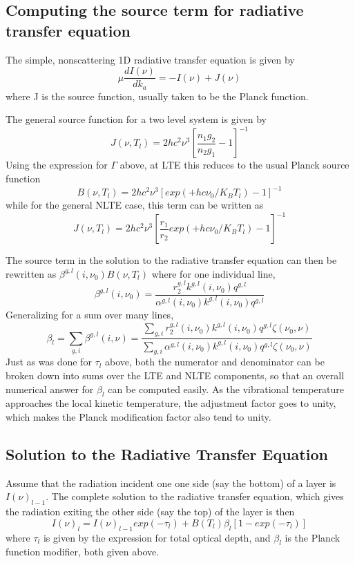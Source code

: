 \documentclass[11pt]{article}
\begin{document}
\subsection{Computing the source term for radiative transfer equation}

The simple, nonscattering 1D radiative transfer equation is given by
\[
\mu \frac{dI(\nu)}{dk_{a}} = -I(\nu) + J(\nu)
\]
where J is the source function, usually taken to be the Planck function.

The general source function for a two level system is given by 
\cite{edw:93,edw:98,lop:01}
\[
J(\nu,T_{l}) = 2 h c^{2} \nu^{3} [\frac{n_{1}g_{2}}{n_{2}g_{1}} - 1]^{-1}
\]
Using the expression for $\Gamma$ above, at LTE this reduces to the 
usual Planck source function 
\[
B(\nu,T_{l}) = 2 h c^{2} \nu^{3} [exp(+hc\nu_{0}/K_{B}T_{l}) - 1]^{-1}
\]
while for the general NLTE case, this term can be written as
\[
J(\nu,T_{l}) = 
   2 h c^{2} \nu^{3} [\frac{r_{1}}{r_{2}} exp(+hc\nu_{0}/K_{B}T_{l}) - 1]^{-1}
\]

The source term in the solution to the radiative transfer equation can then be
rewritten as \cite{edw:93,edw:98,lop:01,kopra} $\beta^{g,l}(i,\nu_0) 
B(\nu,T_{l})$ where for one individual line, 
\[
\beta^{g,l}(i,\nu_0) = \frac{ r_{2}^{g,l} k^{g,l}(i,\nu_0) q^{g,l}}
 {\alpha^{g,l}(i,\nu_0) k^{g,l}(i,\nu_0) q^{g,l}}
\]
Generalizing for a sum over many lines, 
\[
\beta_{l} = \sum_{g,i} \beta^{g,l}(i,\nu) =  
   \frac{ \sum_{g,i} 
       r_{2}^{g,l}(i,\nu_0) k^{g,l}(i,\nu_0) q^{g,l} \zeta(\nu_{0},\nu) } 
   {\sum_{g,i}  
     \alpha^{g,l}(i,\nu_0) k^{g,l}(i,\nu_0) q^{g,l} \zeta(\nu_{0},\nu)}
\]
Just as was done for $\tau_{l}$ above, both the numerator and denominator can
be broken down into sums over the LTE and NLTE components, so that an overall
numerical answer for $\beta_{l}$ can be computed easily.
As the vibrational temperature approaches the local kinetic temperature, the 
adjustment factor goes to unity, which makes the Planck modification factor 
also tend to unity.


\subsection{Solution to the Radiative Transfer Equation}
Assume that the radiation incident one one side (say the bottom) of a layer is
$I(\nu)_{l-1}$. The complete solution to the radiative transfer equation, which
gives the radiation exiting the other side (say the top) of the layer is then
\cite{edw:93,edw:98,lop:01,kopra}
\[
I(\nu)_{l} = I(\nu)_{l-1}exp(-{\tau_{l}}) 
             + B(T_{l}) \beta_{l} [1 - exp(-{\tau_{l}})]
\]
where $\tau_{l}$ is given by the expression for total optical depth, and 
$\beta_{l}$ is the Planck function modifier, both given above.
\end{document}
